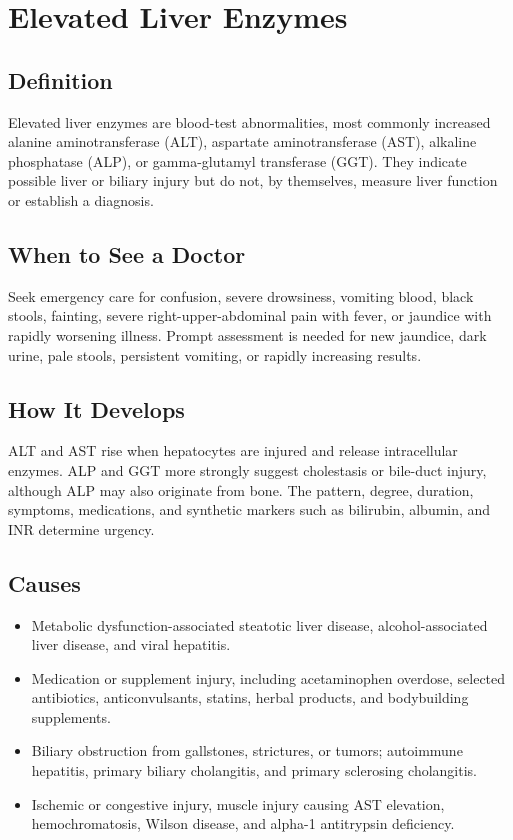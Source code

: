 \chapter{Elevated Liver Enzymes}

\section*{Definition}
Elevated liver enzymes are blood-test abnormalities, most commonly increased alanine aminotransferase (ALT), aspartate aminotransferase (AST), alkaline phosphatase (ALP), or gamma-glutamyl transferase (GGT). They indicate possible liver or biliary injury but do not, by themselves, measure liver function or establish a diagnosis.

\section*{When to See a Doctor}
Seek emergency care for confusion, severe drowsiness, vomiting blood, black stools, fainting, severe right-upper-abdominal pain with fever, or jaundice with rapidly worsening illness. Prompt assessment is needed for new jaundice, dark urine, pale stools, persistent vomiting, or rapidly increasing results.

\section*{How It Develops}
ALT and AST rise when hepatocytes are injured and release intracellular enzymes. ALP and GGT more strongly suggest cholestasis or bile-duct injury, although ALP may also originate from bone. The pattern, degree, duration, symptoms, medications, and synthetic markers such as bilirubin, albumin, and INR determine urgency.

\section*{Causes}
\begin{itemize}
  \item Metabolic dysfunction-associated steatotic liver disease, alcohol-associated liver disease, and viral hepatitis.
  \item Medication or supplement injury, including acetaminophen overdose, selected antibiotics, anticonvulsants, statins, herbal products, and bodybuilding supplements.
  \item Biliary obstruction from gallstones, strictures, or tumors; autoimmune hepatitis, primary biliary cholangitis, and primary sclerosing cholangitis.
  \item Ischemic or congestive injury, muscle injury causing AST elevation, hemochromatosis, Wilson disease, and alpha-1 antitrypsin deficiency.
\end{itemize}

